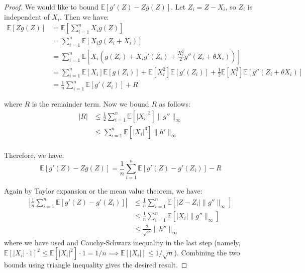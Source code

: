 \documentclass{article}
\begin{document}
\begin{proof}
    We would like to bound $\mathbb{E}[g'(Z)-Zg(Z)]$. Let $Z_i = Z - X_i$, so $Z_i$ is independent of $X_i$. Then we have:
    \begin{align*}
        \mathbb{E}[Zg(Z)] &= \mathbb{E}[\sum_{i=1}^{n} X_i g(Z)]\\
        &= \sum_{i=1}^{n} \mathbb{E}[X_i g(Z_i + X_i)]\\
        &= \sum_{i=1}^{n} \mathbb{E}[X_i (g(Z_i) + X_i g'(Z_i) + \frac{X_i^2}{2} g''(Z_i +\theta X_i))]\\
        &= \sum_{i=1}^{n} \mathbb{E}[X_i] \mathbb{E}[g(Z_i)] + \mathbb{E}[X_i^2] \mathbb{E}[g'(Z_i)] + \frac{1}{2} \mathbb{E}[X_i^3] \mathbb{E}[g''(Z_i +\theta X_i)]\\
        &= \frac{1}{n} \sum_{i=1}^{n} \mathbb{E}[g'(Z_i)] + R
    \end{align*}

    where $R$ is the remainder term. Now we bound $R$ as follows:
    \begin{align*}
        |R| &\leq \frac{1}{2} \sum_{i=1}^{n} \mathbb{E}[|X_i|^3] \|g''\|_\infty\\
        &\leq \sum_{i=1}^{n} \mathbb{E}[|X_i|^3] \|h'\|_\infty\\
    \end{align*}

    Therefore, we have:
    \begin{equation*}
        \mathbb{E}[g'(Z)-Zg(Z)] = \frac{1}{n} \sum_{i=1}^{n} \mathbb{E}[g'(Z) -g'(Z_i)] - R
    \end{equation*}

    Again by Taylor expansion or the mean value theorem, we have:
    \begin{align*}
        \left|\frac{1}{n} \sum_{i=1}^{n} \mathbb{E}[g'(Z) -g'(Z_i)]\right| &\leq \frac{1}{n} \sum_{i=1}^{n} \mathbb{E}[|Z-Z_i| \|g''\|_\infty]\\ 
        &\leq \frac{1}{n} \sum_{i=1}^{n} \mathbb{E}[|X_i| \|g''\|_\infty] \\
        &\leq \frac{2}{\sqrt{n}} \|h''\|_\infty
    \end{align*}
    where we have used  and Cauchy-Schwarz inequality in the last step (namely, $\mathbb{E}[|X_i| \cdot 1]^2 \leq \mathbb{E}[|X_i|^2] \cdot 1=1/n \implies \mathbb{E}[|X_i|]\leq 1/\sqrt{n}$). Combining the two bounds using triangle inequality gives the desired result.
\end{proof}
\end{document}
